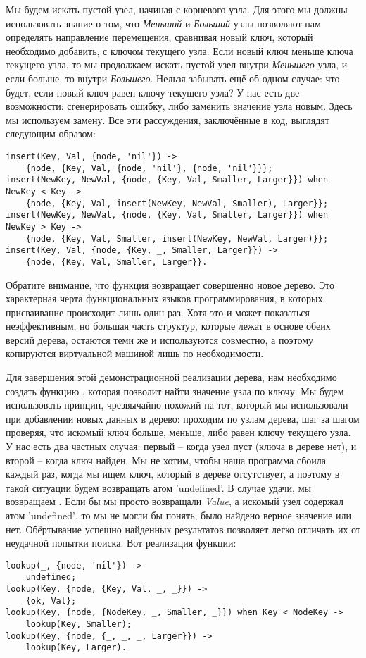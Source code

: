 Мы будем искать пустой узел, начиная с корневого узла.
Для этого мы должны использовать знание о том, что \emph{Меньший} и \emph{Больший} узлы позволяют нам определять направление перемещения, сравнивая новый ключ, который необходимо добавить, с ключом текущего узла.
Если новый ключ меньше ключа текущего узла, то мы продолжаем искать пустой узел внутри \emph{Меньшего} узла, и если больше, то внутри \emph{Большего}.
Нельзя забывать ещё об одном случае: что будет, если новый ключ равен ключу текущего узла?
У нас есть две возможности: сгенерировать ошибку, либо заменить значение узла новым.
Здесь мы используем замену.
Все эти рассуждения, заключённые в код, выглядят следующим образом:
\begin{lstlisting}[style=erlang]
insert(Key, Val, {node, 'nil'}) ->
    {node, {Key, Val, {node, 'nil'}, {node, 'nil'}}};
insert(NewKey, NewVal, {node, {Key, Val, Smaller, Larger}}) when NewKey < Key ->
    {node, {Key, Val, insert(NewKey, NewVal, Smaller), Larger}};
insert(NewKey, NewVal, {node, {Key, Val, Smaller, Larger}}) when NewKey > Key ->
    {node, {Key, Val, Smaller, insert(NewKey, NewVal, Larger)}};
insert(Key, Val, {node, {Key, _, Smaller, Larger}}) ->
    {node, {Key, Val, Smaller, Larger}}.
\end{lstlisting}

Обратите внимание, что функция возвращает совершенно новое дерево.
Это характерная черта функциональных языков программирования, в которых присваивание происходит лишь один раз.
Хотя это и может показаться неэффективным, но большая часть структур, которые лежат в основе обеих версий дерева, остаются теми же и используются совместно, а поэтому копируются виртуальной машиной лишь по необходимости.

Для завершения этой демонстрационной реализации дерева, нам необходимо создать функцию , которая позволит найти значение узла по ключу.
Мы будем использовать принцип, чрезвычайно похожий на тот, который мы использовали при добавлении новых данных в дерево: проходим по узлам дерева, шаг за шагом проверяя, что искомый ключ больше, меньше, либо равен ключу текущего узла.
У нас есть два частных случая: первый \--- когда узел пуст (ключа в дереве нет), и второй \--- когда ключ найден.
Мы не хотим, чтобы наша программа сбоила каждый раз, когда мы ищем ключ, который в дереве отсутствует, а поэтому в такой ситуации будем возвращать атом 'undefined'.
В случае удачи, мы возвращаем .
Если бы мы просто возвращали \emph{Value}, а искомый узел содержал атом 'undefined', то мы не могли бы понять, было найдено верное значение или нет.
Обёртывание успешно найденных результатов позволяет легко отличать их от неудачной попытки поиска.
Вот реализация функции:
\begin{lstlisting}[style=erlang]
lookup(_, {node, 'nil'}) ->
    undefined;
lookup(Key, {node, {Key, Val, _, _}}) ->
    {ok, Val};
lookup(Key, {node, {NodeKey, _, Smaller, _}}) when Key < NodeKey ->
    lookup(Key, Smaller);
lookup(Key, {node, {_, _, _, Larger}}) ->
    lookup(Key, Larger).
\end{lstlisting}

